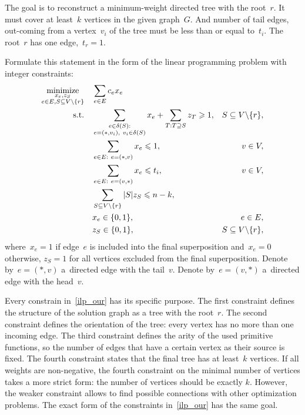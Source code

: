 \documentclass[12pt]{article}
\begin{document}
The goal is to reconstruct a minimum-weight directed tree with the root~$r$. It must cover at least~$k$ vertices in the given graph~$G$. And number of tail edges, out-coming from a vertex~$v_i$ of the tree must be less than or equal to~$t_i$. The root~$r$ has one edge,~$t_r=1$.

Formulate this statement in the form of the linear programming problem with integer constraints:
\begin{align}
\underset{\substack{x_e, z_S \\ e\in E, S\subseteq V\backslash \{r\}}}{\text{minimize}}\quad & \sum\limits_{e\in E}c_ex_e \nonumber\\
\text{s.t.\quad} & \sum\limits_{\substack{e\in\delta(S):\\e=(\ast,v_i),~ v_i\in\delta(S)}}x_e + \sum\limits_{T:T\supseteq S}z_T\geqslant 1, & S\subseteq V\backslash \{r\},\nonumber\\
& \sum\limits_{e\in E:~e=(\ast,v)}x_e\leqslant 1, & v\in V,
\label{ilp_our}\\
& \sum\limits_{e\in E:~e=(v,\ast)}x_e\leqslant t_i, & v\in V,\nonumber\\
& \sum\limits_{S\subseteq V\backslash \{r\}}|S|z_S \leqslant n-k,\nonumber\\
& x_e\in\{0,1\}, & e\in E,\nonumber\\
& z_S\in\{0,1\}, & S\subseteq V\backslash \{r\},\nonumber
\end{align}
where~$x_e = 1$ if edge~$e$ is included into the final superposition and~$x_e = 0$ otherwise, $z_S = 1$ for all vertices excluded from the final superposition. Denote by~$e=(\ast, v)$ a~directed edge with the tail~$v$. Denote by~$e=(v, \ast)$  a~directed edge with the head~$v$.

Every constrain in~\eqref{ilp_our} has its specific purpose.
The first constraint defines the structure of the solution graph as a tree with the root~$r$.
The second constraint defines the orientation of the tree: every vertex has no more than one incoming edge.
The third constraint defines the arity of the used primitive functions, so the number of edges that have a certain vertex as their source is fixed.
The fourth constraint states that the final tree has at least~$k$ vertices. If all weights are non-negative, the fourth constraint on the minimal number of vertices takes a more strict form: the number of vertices should be exactly $k$. However, the weaker constraint allows to find possible connections with other optimization problems. The exact form of the constraints in~\eqref{ilp_our} has the same goal.
\end{document}
